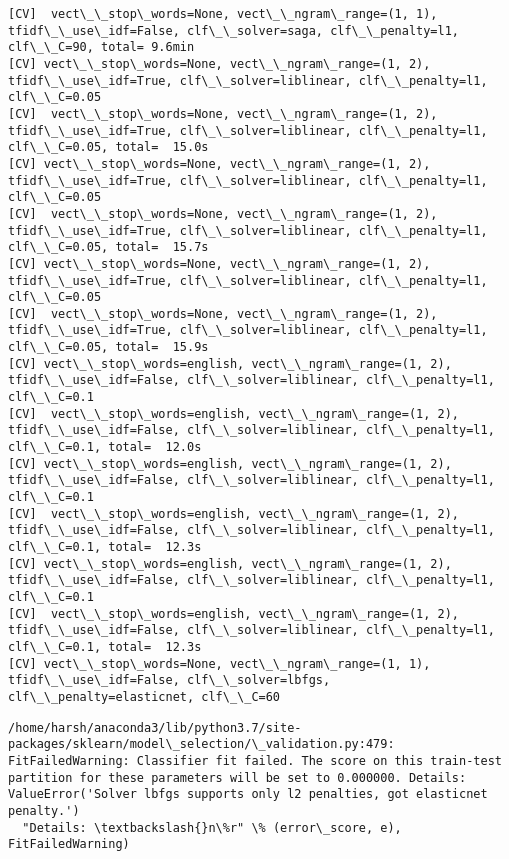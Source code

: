 \documentclass[11pt]{article}
\begin{document}
    \begin{Verbatim}[commandchars=\\\{\}]
[CV]  vect\_\_stop\_words=None, vect\_\_ngram\_range=(1, 1), tfidf\_\_use\_idf=False, clf\_\_solver=saga, clf\_\_penalty=l1, clf\_\_C=90, total= 9.6min
[CV] vect\_\_stop\_words=None, vect\_\_ngram\_range=(1, 2), tfidf\_\_use\_idf=True, clf\_\_solver=liblinear, clf\_\_penalty=l1, clf\_\_C=0.05 
[CV]  vect\_\_stop\_words=None, vect\_\_ngram\_range=(1, 2), tfidf\_\_use\_idf=True, clf\_\_solver=liblinear, clf\_\_penalty=l1, clf\_\_C=0.05, total=  15.0s
[CV] vect\_\_stop\_words=None, vect\_\_ngram\_range=(1, 2), tfidf\_\_use\_idf=True, clf\_\_solver=liblinear, clf\_\_penalty=l1, clf\_\_C=0.05 
[CV]  vect\_\_stop\_words=None, vect\_\_ngram\_range=(1, 2), tfidf\_\_use\_idf=True, clf\_\_solver=liblinear, clf\_\_penalty=l1, clf\_\_C=0.05, total=  15.7s
[CV] vect\_\_stop\_words=None, vect\_\_ngram\_range=(1, 2), tfidf\_\_use\_idf=True, clf\_\_solver=liblinear, clf\_\_penalty=l1, clf\_\_C=0.05 
[CV]  vect\_\_stop\_words=None, vect\_\_ngram\_range=(1, 2), tfidf\_\_use\_idf=True, clf\_\_solver=liblinear, clf\_\_penalty=l1, clf\_\_C=0.05, total=  15.9s
[CV] vect\_\_stop\_words=english, vect\_\_ngram\_range=(1, 2), tfidf\_\_use\_idf=False, clf\_\_solver=liblinear, clf\_\_penalty=l1, clf\_\_C=0.1 
[CV]  vect\_\_stop\_words=english, vect\_\_ngram\_range=(1, 2), tfidf\_\_use\_idf=False, clf\_\_solver=liblinear, clf\_\_penalty=l1, clf\_\_C=0.1, total=  12.0s
[CV] vect\_\_stop\_words=english, vect\_\_ngram\_range=(1, 2), tfidf\_\_use\_idf=False, clf\_\_solver=liblinear, clf\_\_penalty=l1, clf\_\_C=0.1 
[CV]  vect\_\_stop\_words=english, vect\_\_ngram\_range=(1, 2), tfidf\_\_use\_idf=False, clf\_\_solver=liblinear, clf\_\_penalty=l1, clf\_\_C=0.1, total=  12.3s
[CV] vect\_\_stop\_words=english, vect\_\_ngram\_range=(1, 2), tfidf\_\_use\_idf=False, clf\_\_solver=liblinear, clf\_\_penalty=l1, clf\_\_C=0.1 
[CV]  vect\_\_stop\_words=english, vect\_\_ngram\_range=(1, 2), tfidf\_\_use\_idf=False, clf\_\_solver=liblinear, clf\_\_penalty=l1, clf\_\_C=0.1, total=  12.3s
[CV] vect\_\_stop\_words=None, vect\_\_ngram\_range=(1, 1), tfidf\_\_use\_idf=False, clf\_\_solver=lbfgs, clf\_\_penalty=elasticnet, clf\_\_C=60 

    \end{Verbatim}

    \begin{Verbatim}[commandchars=\\\{\}]
/home/harsh/anaconda3/lib/python3.7/site-packages/sklearn/model\_selection/\_validation.py:479: FitFailedWarning: Classifier fit failed. The score on this train-test partition for these parameters will be set to 0.000000. Details: 
ValueError('Solver lbfgs supports only l2 penalties, got elasticnet penalty.')
  "Details: \textbackslash{}n\%r" \% (error\_score, e), FitFailedWarning)

    \end{Verbatim}
\end{document}
